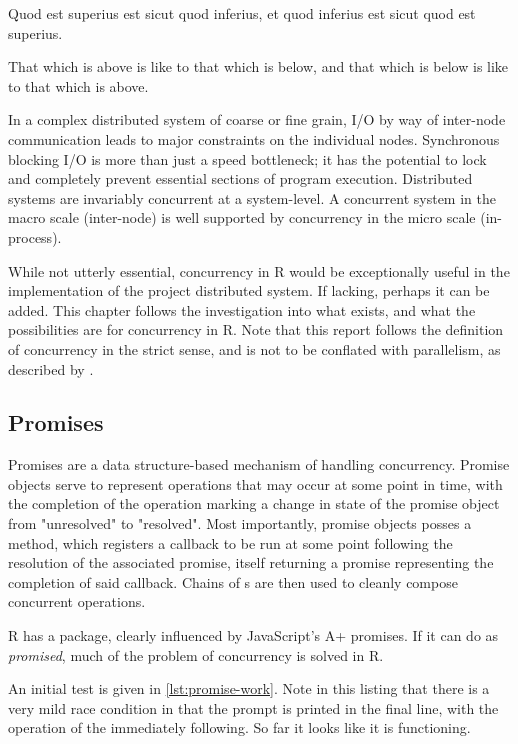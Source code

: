 \begin{displayquote}
Quod est superius est sicut quod inferius, et quod inferius est sicut quod est superius.

That which is above is like to that which is below, and that which is below is like to that which is above.
\end{displayquote}

In a complex distributed system of coarse or fine grain, I/O by way of inter-node communication leads to major constraints on the individual nodes.
Synchronous blocking I/O is more than just a speed bottleneck; it has the potential to lock and completely prevent essential sections of program execution.
Distributed systems are invariably concurrent at a system-level.
A concurrent system in the macro scale (inter-node) is well supported by concurrency in the micro scale (in-process).

While not utterly essential, concurrency in R would be exceptionally useful in the implementation of the project distributed system.
If lacking, perhaps it can be added.
This chapter follows the investigation into what exists, and what the possibilities are for concurrency in R.
Note that this report follows the definition of concurrency in the strict sense, and is not to be conflated with parallelism, as described by \textcite{pike2012concurrency}.

\subsection{Promises}

Promises are a data structure-based mechanism of handling concurrency\cite{liskov1988promises}.
Promise objects serve to represent operations that may occur at some point in time, with the completion of the operation marking a change in state of the promise object from "unresolved" to "resolved".
Most importantly, promise objects posses a  method, which registers a callback to be run at some point following the resolution of the associated promise, itself returning a promise representing the completion of said callback.
Chains of s are then used to cleanly compose concurrent operations.

R has a  package, clearly influenced by JavaScript's A+ promises\cite{cheng2021promises}.
If it can do as \textit{promised}, much of the problem of concurrency is solved in R.

An initial test is given in \ref{lst:promise-work}.
Note in this listing that there is a very mild race condition in that the prompt is printed in the final line, with the operation of the  immediately following.
So far it looks like it is functioning.

